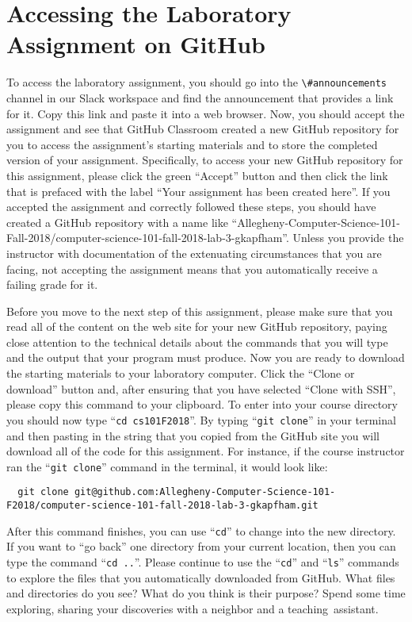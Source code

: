 \documentclass[11pt]{article}
\newcommand{\command}[1]{``\lstinline{#1}''}
\newcommand{\channel}[1]{\lstinline{#1}}
\newcommand{\step}[1]{``{#1}''}
\begin{document}
\section*{Accessing the Laboratory Assignment on GitHub}

To access the laboratory assignment, you should go into the
\channel{\#announcements} channel in our Slack workspace and find the
announcement that provides a link for it. Copy this link and paste it into a web
browser. Now, you should accept the assignment and see that GitHub Classroom
created a new GitHub repository for you to access the assignment's starting
materials and to store the completed version of your assignment. Specifically,
to access your new GitHub repository for this assignment, please click the green
``Accept'' button and then click the link that is prefaced with the label ``Your
assignment has been created here''. If you accepted the assignment and correctly
followed these steps, you should have created a GitHub repository with a name
like
``Allegheny-Computer-Science-101-Fall-2018/computer-science-101-fall-2018-lab-3-gkapfham''.
Unless you provide the instructor with documentation of the extenuating
circumstances that you are facing, not accepting the assignment means that you
automatically receive a failing grade for it.

Before you move to the next step of this assignment, please make sure that you
read all of the content on the web site for your new GitHub repository, paying
close attention to the technical details about the commands that you will type
and the output that your program must produce. Now you are ready to download the
starting materials to your laboratory computer. Click the ``Clone or download''
button and, after ensuring that you have selected ``Clone with SSH'', please
copy this command to your clipboard. To enter into your course directory you
should now type \command{cd cs101F2018}. By typing \command{git clone} in your
terminal and then pasting in the string that you copied from the GitHub site you
will download all of the code for this assignment. For instance, if the course
instructor ran the \command{git clone} command in the terminal, it would look
like:

\begin{lstlisting}
  git clone git@github.com:Allegheny-Computer-Science-101-F2018/computer-science-101-fall-2018-lab-3-gkapfham.git
\end{lstlisting}

After this command finishes, you can use \command{cd} to change into the new
directory. If you want to \step{go back} one directory from your current
location, then you can type the command \command{cd ..}. Please continue to use
the \command{cd} and \command{ls} commands to explore the files that you
automatically downloaded from GitHub. What files and directories do you see?
What do you think is their purpose? Spend some time exploring, sharing your
discoveries with a neighbor and a \mbox{teaching assistant}.
\end{document}
